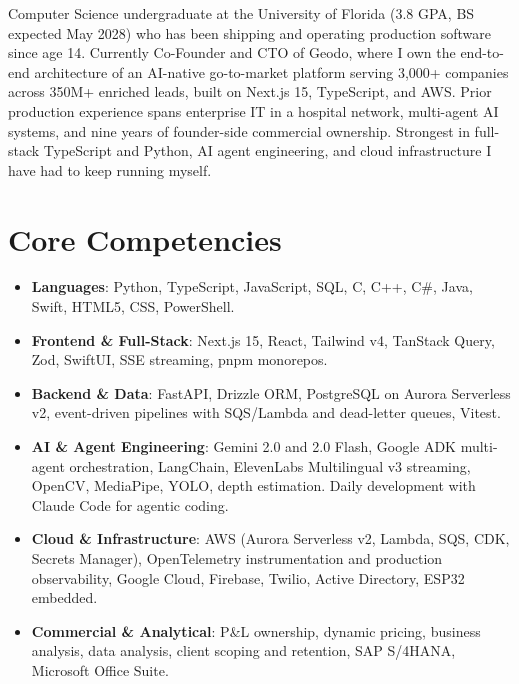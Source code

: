 \documentclass[11pt,a4paper,sans]{moderncv}
\begin{document}
\makecvtitle


\vspace{6pt}
\small{Computer Science undergraduate at the University of Florida (3.8 GPA, BS expected May 2028) who has been shipping and operating production software since age 14. Currently Co-Founder and CTO of Geodo, where I own the end-to-end architecture of an AI-native go-to-market platform serving 3,000+ companies across 350M+ enriched leads, built on Next.js 15, TypeScript, and AWS. Prior production experience spans enterprise IT in a hospital network, multi-agent AI systems, and nine years of founder-side commercial ownership. Strongest in full-stack TypeScript and Python, AI agent engineering, and cloud infrastructure I have had to keep running myself.}


\section{Core Competencies}
\vspace{1pt}
\begin{itemize}

\item \textbf{Languages}: Python, TypeScript, JavaScript, SQL, C, C++, C\#, Java, Swift, HTML5, CSS, PowerShell.

\item \textbf{Frontend \& Full-Stack}: Next.js 15, React, Tailwind v4, TanStack Query, Zod, SwiftUI, SSE streaming, pnpm monorepos.

\item \textbf{Backend \& Data}: FastAPI, Drizzle ORM, PostgreSQL on Aurora Serverless v2, event-driven pipelines with SQS/Lambda and dead-letter queues, Vitest.

\item \textbf{AI \& Agent Engineering}: Gemini 2.0 and 2.0 Flash, Google ADK multi-agent orchestration, LangChain, ElevenLabs Multilingual v3 streaming, OpenCV, MediaPipe, YOLO, depth estimation. Daily development with Claude Code for agentic coding.

\item \textbf{Cloud \& Infrastructure}: AWS (Aurora Serverless v2, Lambda, SQS, CDK, Secrets Manager), OpenTelemetry instrumentation and production observability, Google Cloud, Firebase, Twilio, Active Directory, ESP32 embedded.

\item \textbf{Commercial \& Analytical}: P\&L ownership, dynamic pricing, business analysis, data analysis, client scoping and retention, SAP S/4HANA, Microsoft Office Suite.

\end{itemize}
\end{document}
